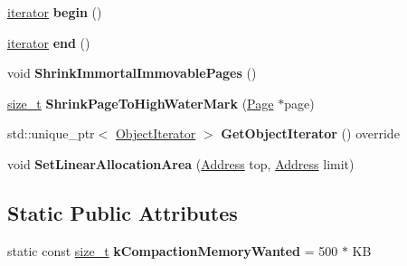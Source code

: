 \begin{DoxyCompactItemize}
\mbox{\label{classv8_1_1internal_1_1PagedSpace_a4588395e6526bb7865ebd2e77b692050}} 
\mbox{\hyperlink{classv8_1_1internal_1_1PageIteratorImpl}{iterator}} {\bfseries begin} ()
\item 
\mbox{\label{classv8_1_1internal_1_1PagedSpace_a52d6b906c32bdac6af24a04e9ad59a0e}} 
\mbox{\hyperlink{classv8_1_1internal_1_1PageIteratorImpl}{iterator}} {\bfseries end} ()
\item 
\mbox{\label{classv8_1_1internal_1_1PagedSpace_a56074b52c4273e8f2e0a9792fe90b402}} 
void {\bfseries Shrink\+Immortal\+Immovable\+Pages} ()
\item 
\mbox{\label{classv8_1_1internal_1_1PagedSpace_a12fa02c1c5b7cb6a578f34d34aba421c}} 
\mbox{\hyperlink{classsize__t}{size\+\_\+t}} {\bfseries Shrink\+Page\+To\+High\+Water\+Mark} (\mbox{\hyperlink{classv8_1_1internal_1_1Page}{Page}} $\ast$page)
\item 
\mbox{\label{classv8_1_1internal_1_1PagedSpace_ab193eb3d2aed412789962d77736f43bb}} 
std\+::unique\+\_\+ptr$<$ \mbox{\hyperlink{classv8_1_1internal_1_1ObjectIterator}{Object\+Iterator}} $>$ {\bfseries Get\+Object\+Iterator} () override
\item 
\mbox{\label{classv8_1_1internal_1_1PagedSpace_a943ac15803d76b5975fd5c5694b734c0}} 
void {\bfseries Set\+Linear\+Allocation\+Area} (\mbox{\hyperlink{classuintptr__t}{Address}} top, \mbox{\hyperlink{classuintptr__t}{Address}} limit)
\end{DoxyCompactItemize}
\subsection*{Static Public Attributes}
\begin{DoxyCompactItemize}
\item 
\mbox{\label{classv8_1_1internal_1_1PagedSpace_a6113b6e185113349e4e5e55b6a2dc72e}} 
static const \mbox{\hyperlink{classsize__t}{size\+\_\+t}} {\bfseries k\+Compaction\+Memory\+Wanted} = 500 $\ast$ KB
\end{DoxyCompactItemize}
